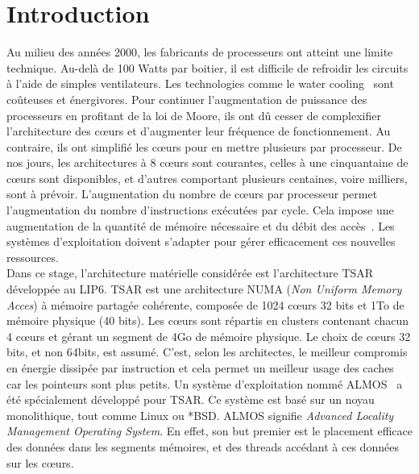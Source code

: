 \chapter{Introduction}

  \hspace{1cm}Au milieu des années 2000, les fabricants de processeurs ont
  atteint une limite technique.  Au-delà de 100 Watts par boitier, il est
  difficile de refroidir les circuits à l'aide de simples ventilateurs. Les
  technologies comme le water cooling~\citep{googleXXXXdatacenters} sont
  coûteuses et énergivores.  Pour continuer l'augmentation de puissance des
  processeurs en profitant de la loi de Moore, ils ont dû cesser de complexifier
  l'architecture des c\oe urs et d'augmenter leur fréquence de
  fonctionnement. Au contraire, ils ont simplifié les c\oe urs pour en mettre
  plusieurs par processeur.  De nos jours, les architectures à 8 c\oe urs sont
  courantes, celles à une cinquantaine de c\oe urs sont disponibles, et d'autres
  comportant plusieurs centaines, voire milliers, sont à prévoir.
  L'augmentation du nombre de c\oe urs par processeur permet l'augmentation du
  nombre d'instructions exécutées par cycle.  Cela impose une augmentation de la
  quantité de mémoire nécessaire et du débit des accès~\citep{hp2012z820,
    puget2013z9pe}. Les systèmes d'exploitation doivent s'adapter pour gérer
  efficacement ces nouvelles ressources.\\

  \hspace{1cm}Dans ce stage, l'architecture matérielle considérée est
  l'architecture TSAR~\citep{greiner2009tsar} développée au LIP6. TSAR est une
  architecture NUMA (\textit{Non Uniform Memory Acces}) à mémoire partagée
  cohérente, composée de 1024 c\oe urs 32 bits et 1To de mémoire physique (40
  bits).  Les c\oe urs sont répartis en clusters contenant chacun 4 c\oe urs et
  gérant un segment de 4Go de mémoire physique. Le choix de c\oe urs 32 bits, et
  non 64bits, est assumé. C'est, selon les architectes, le meilleur compromis en
  énergie dissipée par instruction et cela permet un meilleur usage des caches
  car les pointeurs sont plus petits.  Un système d'exploitation nommé
  ALMOS~\citep{almaless2011almos} a été spécialement développé pour TSAR. Ce
  système est basé sur un noyau monolithique, tout comme Linux ou *BSD. ALMOS
  signifie \textit{Advanced Locality Management Operating System}. En effet, son
  but premier est le placement efficace des données dans les segments mémoires,
  et des threads accédant à ces données sur les c\oe urs.\\

